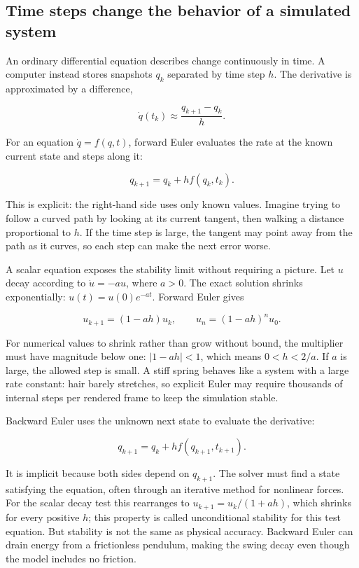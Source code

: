 \subsection{Time steps change the behavior of a simulated system}\label{04-visual-computing-ii-ch029-time-steps-change-the-behavior-of-a-simulated-system}

An ordinary differential equation describes change continuously in time. A computer instead stores snapshots \(q_k\) separated by time step \(h\). The derivative is approximated by a difference,

\[
\dot q(t_k)\approx\frac{q_{k+1}-q_k}{h}.
\]

For an equation \(\dot q=f(q,t)\), forward Euler evaluates the rate at the known current state and steps along it:

\[
q_{k+1}=q_k+h f(q_k,t_k).
\]

This is explicit: the right-hand side uses only known values. Imagine trying to follow a curved path by looking at its current tangent, then walking a distance proportional to \(h\). If the time step is large, the tangent may point away from the path as it curves, so each step can make the next error worse.

A scalar equation exposes the stability limit without requiring a picture. Let \(u\) decay according to \(\dot u=-a u\), where \(a>0\). The exact solution shrinks exponentially: \(u(t)=u(0)e^{-at}\). Forward Euler gives

\[
u_{k+1}=(1-ah)u_k,
\qquad
u_n=(1-ah)^n u_0.
\]

For numerical values to shrink rather than grow without bound, the multiplier must have magnitude below one: \(|1-ah|<1\), which means \(0<h<2/a\). If \(a\) is large, the allowed step is small. A stiff spring behaves like a system with a large rate constant: hair barely stretches, so explicit Euler may require thousands of internal steps per rendered frame to keep the simulation stable.

Backward Euler uses the unknown next state to evaluate the derivative:

\[
q_{k+1}=q_k+h f(q_{k+1},t_{k+1}).
\]

It is implicit because both sides depend on \(q_{k+1}\). The solver must find a state satisfying the equation, often through an iterative method for nonlinear forces. For the scalar decay test this rearranges to \(u_{k+1}=u_k/(1+ah)\), which shrinks for every positive \(h\); this property is called unconditional stability for this test equation. But stability is not the same as physical accuracy. Backward Euler can drain energy from a frictionless pendulum, making the swing decay even though the model includes no friction.

